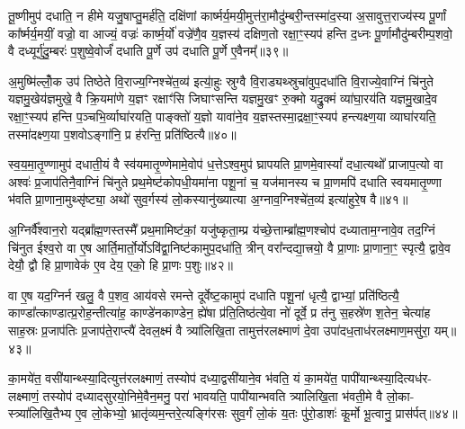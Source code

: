 तू॒ष्णीमुप॑ दधाति॒ न हीमे यजु॒षाप्तु॒मर्\mbox{}ह॑ति॒ दक्षि॑णां कार्ष्मर्य॒मयी॒मुत्त॑रा॒मौदु॑म्बरी॒न्तस्मा॑द॒स्या अ॒सावुत्त॒राज्य॑स्य पू॒र्णां का᳚र्ष्मर्य॒मयीं॒ वज्रो॒ वा आज्यं॒ वज्रः॑ कार्ष्म॒र्यो॑ वज्रे॑णै॒व य॒ज्ञस्य॑ दक्षिण॒तो रक्षा॒ꣳ॒स्यप॑ हन्ति द॒ध्नः पू॒र्णामौदु॑म्बरीम्प॒शवो॒ वै दध्यूर्गु॑दु॒म्बरः॑ प॒शुष्वे॒वोर्जं॑ दधाति पू॒र्णे उप॑ दधाति पू॒र्णे ए॒वैनम्᳚॥३९॥

अ॒मुष्मि॑ल्लोँ॒क उप॑ तिष्ठेते वि॒राज्य॒ग्निश्चे॑त॒व्य॑ इत्या॒॑हुः स्रुग्वै वि॒राड्यथ्स्रुचा॑वुप॒दधा॑ति वि॒राज्ये॒वाग्निं चि॑नुते यज्ञमु॒खेय॑ज्ञमुखे॒ वै क्रि॒यमा॑णे य॒ज्ञꣳ रक्षाꣳ॑सि जिघाꣳसन्ति यज्ञमु॒खꣳ रु॒क्मो यद्रु॒क्मं व्या॑घा॒रय॑ति यज्ञमु॒खादे॒व रक्षा॒ꣳ॒स्यप॑ हन्ति प॒ञ्चभि॒र्व्याघा॑रयति॒ पाङ्क्तो॑ य॒ज्ञो यावा॑ने॒व य॒ज्ञस्तस्मा॒द्रक्षा॒ꣳ॒स्यप॑ हन्त्यक्ष्ण॒या व्याघा॑रयति॒ तस्मा॑दक्ष्ण॒या प॒शवो\-ऽङ्गा॑नि॒ प्र ह॑रन्ति॒ प्रति॑ष्ठित्यै॥४०॥

{\anuvakamend[{वन॒स्पत॑यो दक्षिण॒तो ध॑त्त एन॒न्तस्मा॑दक्ष्ण॒या पञ्च॑ च॥७॥}]}

स्व॒य॒मा॒तृ॒ण्णामुप॑ दधाती॒यं वै स्व॑यमातृ॒ण्णेमामे॒वोप॑ ध॒त्ते\-ऽश्व॒मुप॑ घ्रापयति प्रा॒णमे॒वास्यां᳚ दधा॒त्यथो᳚ प्राजाप॒त्यो वा अश्वः॑ प्र॒जाप॑तिनै॒वाग्निं चि॑नुते प्रथ॒मेष्ट॑कोपधी॒यमा॑ना पशू॒नां च॒ यज॑मानस्य च प्रा॒णमपि॑ दधाति स्वयमातृ॒ण्णा भ॑वति प्रा॒णाना॒मुथ्सृ॑ष्ट्या॒ अथो॑ सुव॒र्गस्य॑ लो॒कस्यानु॑ख्यात्या अ॒ग्नाव॒ग्निश्चे॑त॒व्य॑ इत्या॑हुरे॒ष वै॥४१॥

अ॒ग्निर्वै᳚श्वान॒रो यद्ब्रा᳚ह्म॒णस्तस्मै᳚ प्रथ॒मामिष्ट॑कां॒ यजु॑ष्कृता॒म्प्र य॑च्छे॒त्ताम्ब्रा᳚ह्म॒णश्चोप॑ दध्याताम॒ग्नावे॒व तद॒ग्निं चि॑नुत ईश्व॒रो वा ए॒ष आर्ति॒मार्तो॒र्यो\-ऽवि॑द्वा॒निष्ट॑कामुप॒दधा॑ति॒ त्रीन् वरा᳚न्दद्या॒त्त्रयो॒ वै प्रा॒णाः प्रा॒णाना॒ꣳ॒ स्पृत्यै॒ द्वावे॒व देयौ॒ द्वौ हि प्रा॒णावेक॑ ए॒व देय॒ एको॒ हि प्रा॒णः प॒शुः॥४२॥

वा ए॒ष यद॒ग्निर्न खलु॒ वै प॒शव॒ आय॑वसे रमन्ते दूर्वेष्ट॒कामुप॑ दधाति पशू॒नां धृत्यै॒ द्वाभ्यां॒ प्रति॑ष्ठित्यै॒ काण्डा᳚त्काण्डात्प्र॒रोह॒न्तीत्या॑ह॒ काण्डे॑नकाण्डेन॒ ह्ये॑षा प्र॑ति॒तिष्ठ॑त्ये॒वा नो॑ दूर्वे॒ प्र त॑नु स॒हस्रे॑ण श॒तेन॒ चेत्या॑ह साह॒स्रः प्र॒जाप॑तिः प्र॒जाप॑ते॒राप्त्यै॑ देवल॒क्ष्मं वै त्र्या॑लिखि॒ता तामुत्त॑रलक्ष्माणं दे॒वा उपा॑दध॒ताध॑रलक्ष्माण॒मसु॑रा॒ यम्॥४३॥

का॒मये॑त॒ वसी॑यान्थ्स्या॒दित्युत्त॑रलक्ष्माणं॒ तस्योप॑ दध्या॒द्वसी॑याने॒व भ॑वति॒ यं का॒मये॑त॒ पापी॑यान्थ्स्या॒दित्यध॑र- लक्ष्माणं॒ तस्योप॑ दध्यादसुरयो॒निमे॒वैन॒मनु॒ परा॑ भावयति॒ पापी॑यान्भवति त्र्यालिखि॒ता भ॑वती॒मे वै लो॒का- स्त्र्या॑लिखि॒तैभ्य ए॒व लो॒केभ्यो॒ भ्रातृ॑व्यम॒न्तरे॒त्यङ्गि॑रसः सुव॒र्गं लो॒कं य॒तः पु॑रो॒डाशः॑ कू॒र्मो भू॒त्वानु॒ प्रास॑र्पत्॥४४॥

